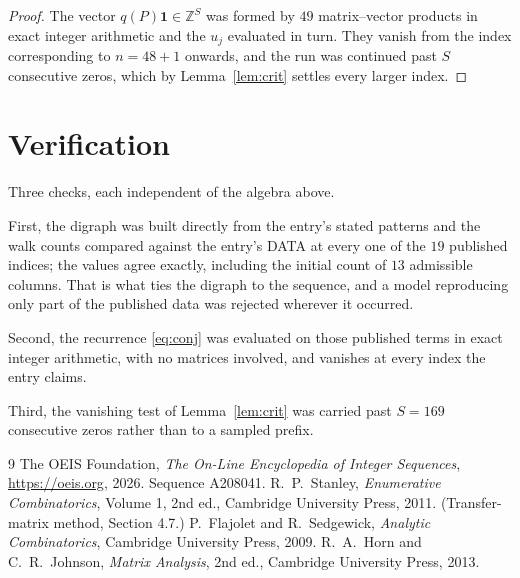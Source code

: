 \documentclass[11pt,a4paper]{article}
\theoremstyle{plain}
\theoremstyle{definition}
\begin{document}
\begin{proof}
The vector $q(P)\mathbf{1}\in\mathbb{Z}^{S}$ was formed by $49$ matrix--vector
products in exact integer arithmetic and the $u_j$ evaluated in turn. They vanish from the
index corresponding to $n=48+1$ onwards, and the run was continued past $S$ consecutive
zeros, which by Lemma~\ref{lem:crit} settles every larger index.
\end{proof}

\section{Verification}

Three checks, each independent of the algebra above.

First, the digraph was built directly from the entry's stated patterns and the walk counts
compared against the entry's DATA at every one of the $19$ published indices; the
values agree exactly, including the initial count of $13$ admissible columns. That is
what ties the digraph to the sequence, and a model reproducing only part of the published
data was rejected wherever it occurred.

Second, the recurrence \eqref{eq:conj} was evaluated on those published terms in exact
integer arithmetic, with no matrices involved, and vanishes at every index the entry claims.

Third, the vanishing test of Lemma~\ref{lem:crit} was carried past $S=169$ consecutive
zeros rather than to a sampled prefix.

\begin{thebibliography}{9}
 The OEIS Foundation, \emph{The On-Line Encyclopedia of Integer
Sequences}, \url{https://oeis.org}, 2026. Sequence A208041.
 R.~P.~Stanley, \emph{Enumerative Combinatorics}, Volume 1, 2nd ed.,
Cambridge University Press, 2011. (Transfer-matrix method, Section 4.7.)
 P.~Flajolet and R.~Sedgewick, \emph{Analytic Combinatorics}, Cambridge
University Press, 2009.
 R.~A.~Horn and C.~R.~Johnson, \emph{Matrix Analysis}, 2nd ed., Cambridge
University Press, 2013.
\end{thebibliography}
\end{document}
